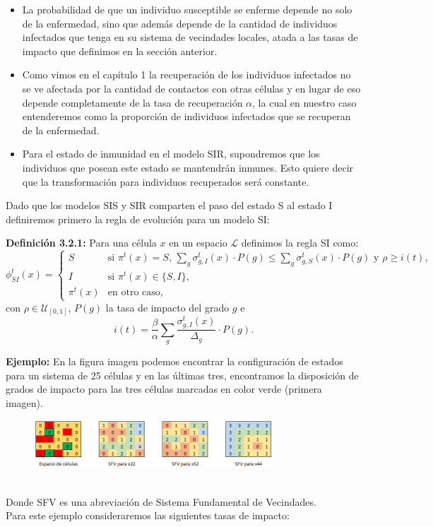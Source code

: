 \begin{itemize}
    \item La probabilidad de que un individuo susceptible se enferme depende no solo de la enfermedad, sino que además depende de la cantidad de individuos infectados que tenga en su sistema de vecindades locales, atada a las tasas de impacto que definimos en la sección anterior. 
    \item Como vimos en el capítulo 1 la recuperación de los individuos infectados no se ve afectada por la cantidad de contactos con otras células y en lugar de eso depende completamente de la tasa de recuperación $\alpha$, la cual en nuestro caso entenderemos como la proporción de individuos infectados que se recuperan de la enfermedad.
    \item Para el estado de inmunidad en el modelo SIR, supondremos que los individuos que posean este estado se mantendrán inmunes. Esto quiere decir que la transformación para individuos recuperados será constante.
\end{itemize}

Dado que los modelos SIS y SIR comparten el paso del estado S al estado I definiremos primero la regla de evolución para un modelo SI:

\textbf{Definición 3.2.1:} Para una célula $x$ en un espacio $\mathcal{L}$ definimos la regla SI como:
\begin{equation}
    \phi_{SI}^t(x)=\left\{\begin{array}{ll}
        S & \text{si }\pi^t(x)=S\text{, }\sum_g{\sigma_{g,I}^t(x)\cdot P(g)}\leq \sum_g{\sigma_{g,S}^t(x)\cdot P(g)}\text{ y }\rho\geq i(t),\\
        I & \text{si }\pi^t(x)\in\{S,I\}\text{,} \\
        \pi^t(x) & \text{en otro caso,}
    \end{array}\right.
\end{equation}
con $\rho\in\mathcal{U}_{[0,1]}$, $P(g)$ la tasa de impacto del grado $g$ e
\begin{equation}
    i(t) = \frac{\beta}{\alpha}\sum_g{\frac{\sigma_{g,I}^t(x)}{\Delta_g}}\cdot P(g).
\end{equation}

\textbf{Ejemplo:} En la figura imagen podemos encontrar la configuración de estados para un sistema de 25 células y en las últimas tres, encontramos la disposición de grados de impacto para las tres células marcadas en color verde (primera imagen).
\begin{figure}[h]
  \centering
    \includegraphics[width=0.8\textwidth]{Imagenes/cellSpace.PNG}
\end{figure}\\
Donde SFV es una abreviación de Sistema Fundamental de Vecindades.\\
Para este ejemplo consideraremos las siguientes tasas de impacto:\\

